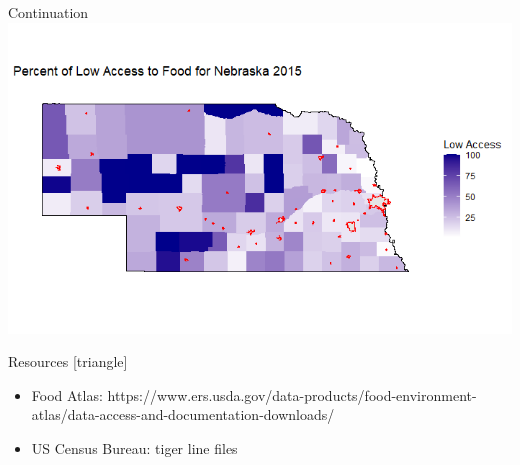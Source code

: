 \documentclass{beamer} %
\begin{document}
 
 
\begin{frame}{Continuation}
\includegraphics{NE_Map.jpg}
\end{frame}
 

\begin{frame}{Resources}
  [triangle]
    \begin{itemize}
      \item Food Atlas: https://www.ers.usda.gov/data-products/food-environment-atlas/data-access-and-documentation-downloads/
      \item US Census Bureau: tiger line files
    \end{itemize}
\end{frame}

\printbibliography

 
\end{document}
